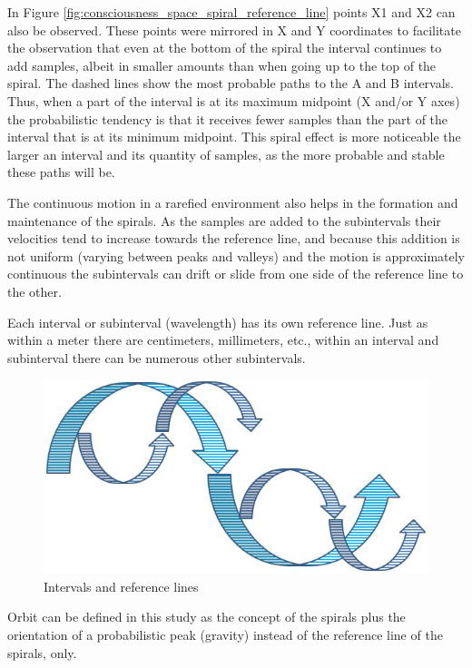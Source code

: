 In Figure \ref{fig:consciousness_space_spiral_reference_line} points X1 and X2 can also be observed. These points were mirrored in X and Y coordinates to facilitate the observation that even at the bottom of the spiral the interval continues to add samples, albeit in smaller amounts than when going up to the top of the spiral. The dashed lines show the most probable paths to the A and B intervals. Thus, when a part of the interval is at its maximum midpoint (X and/or Y axes) the probabilistic tendency is that it receives fewer samples than the part of the interval that is at its minimum midpoint. This spiral effect is more noticeable the larger an interval and its quantity of samples, as the more probable and stable these paths will be.

The continuous motion in a rarefied environment also helps in the formation and maintenance of the spirals. As the samples are added to the subintervals their velocities tend to increase towards the reference line, and because this addition is not uniform (varying between peaks and valleys) and the motion is approximately continuous the subintervals can drift or slide from one side of the reference line to the other.

Each interval or subinterval (wavelength) has its own reference line. Just as within a meter there are centimeters, millimeters, etc., within an interval and subinterval there can be numerous other subintervals.
	\begin{figure}[H]
	\caption{Intervals and reference lines}
	\label{fig:consciousness_space_spiral_underlines}
	\centering
	\includegraphics[scale=.5]{sections/images/consciousness_space_spiral_underlines.jpg}
	\end{figure}

Orbit can be defined in this study as the concept of the spirals plus the orientation of a probabilistic peak (gravity) instead of the reference line of the spirals, only.

